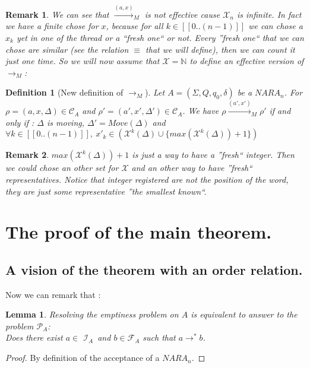 \documentclass[a4paper,10pt]{report}
\newtheorem{lm}{Lemma}[thr]
\newtheorem{df}{Definition}
\newtheorem{rk}{Remark}
\newcommand{\seg}[1]{[\![#1]\!]}
\newcommand{\ts}{\seg{0 .. (n-1)}}
\newcommand{\C}{\mathcal{C}_{A}}
\newcommand{\I}{\mathcal{I}_{A}}
\newcommand{\F}{\mathcal{F}_{A}}
\newcommand{\Xa}{\mathcal{X}}
\newcommand{\X}{\mathcal{X}_{n}}
\newcommand{\pb}{$\mathcal{P}_{A}$}
\begin{document}
\begin{rk}
  We can see that ${\xrightarrow{(a,x)}}_M$ is not effective cause $\X$ is infinite.
  In fact we have a finite chose for $x$, because for all $ k \in \ts$ we can chose a $x_k$ yet in one of the thread or a ``fresh one`` or not.
  Every ''fresh one`` that we can chose are similar (see the relation $\equiv$ that we will define), then we can count it just one time.
  So we will now assume that $\Xa = \mathbb N$ to define an effective version of ${\xrightarrow{}}_M$:
\end{rk}

\begin{df}[New definition of $\rightarrow_M$]
  \label{minipb}
  Let $A = (\Sigma ,Q ,q_0, \delta )$ be a $NARA_n$.
  For $\rho = (a,x,\Delta) \in \C$ and $\rho' = (a',x',\Delta') \in \C$.
  We have $\rho {\xrightarrow{(a',x')}}_M \rho'$ if and only if :
  $\Delta$ is moving, $\Delta' = Move(\Delta)$ and $\forall k \in \ts,\ x'_k \in (\Xa^k(\Delta) \cup \{max(\Xa^k(\Delta))+1\}) $  
\end{df}

\begin{rk}
 $max(\Xa^k(\Delta))+1$ is just a way to have a ''fresh`` integer.
 Then we could chose an other set for $\Xa$ and an other way to have ''fresh`` representatives.
 Notice that integer registered are not the position of the word, they are just some representative ''the smallest known``.  
\end{rk}


\section{The proof of the main theorem.}

\subsection{A vision of the theorem with an order relation.}

Now we can remark that :
\begin{lm}
  \label{lmtth}
  Resolving the emptiness problem on $A$ is equivalent to answer to the problem \pb: \\
  Does there exist $a \in$ $\I$\ and $b \in\F$ such that $ a \rightarrow^* b $. 
\end{lm}
\begin{proof} 
  By definition of the acceptance of a $NARA_n$. 
\end{proof}
\end{document}
